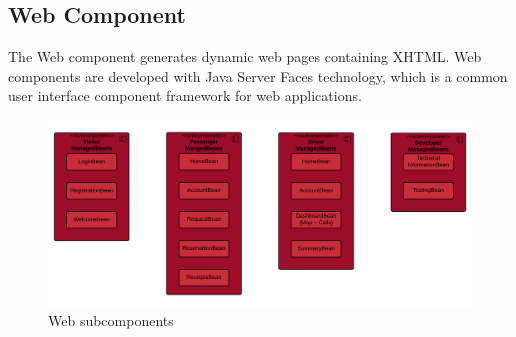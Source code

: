 \subsection{Web Component}
The Web component generates dynamic web pages containing XHTML.
Web components are developed with Java Server Faces technology, which is a common user interface component framework for web applications.

\begin{figure}[htbp]
\centering
\includegraphics[width=\textwidth]{cpt/img/WebInterfaces}
\caption{Web subcomponents}
\end{figure}
\clearpage

